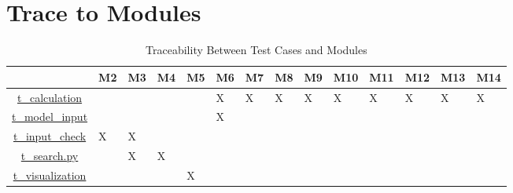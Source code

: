 \documentclass[12pt, titlepage]{article}
\begin{document}
\section{Trace to Modules}		
\begin{table}[h]
\centering

\begin{tabular}{|c|p{4mm}|p{4mm}|p{4mm}|p{4mm}|p{4mm}|p{4mm}|p{4mm}|p{4mm}|p{6mm}|p{6mm}|p{6mm}|p{6mm}|p{6mm}|}
\hline
	& M2 & M3 & M4  & M5 & M6 & M7 & M8 & M9 & M10 & M11 & M12 & M13 & M14 \\
\hline

\href{https://github.com/CynthiaLiu0805/BridgeCorrosion/blob/main/src/database/test_calculation.py}{t\_calculation}    & &  &  &  & X & X & X & X & X & X & X & X & X \\ \hline
\href{https://github.com/CynthiaLiu0805/BridgeCorrosion/blob/main/src/database/test_model_check.py}{t\_model\_input} & &  &  &  & X &  & &  &  &  &  &  & \\ \hline
\href{https://github.com/CynthiaLiu0805/BridgeCorrosion/blob/main/src/app/test_input_check.py}{t\_input\_check} & X & X &  &  &  &  & &  &  &  &  &  & \\ \hline
\href{https://github.com/CynthiaLiu0805/BridgeCorrosion/blob/main/src/app/test_search.py}{t\_search.py} & & X & X &  &  &  & &  &  &  &  &  & \\ \hline
\href{https://github.com/CynthiaLiu0805/BridgeCorrosion/blob/main/src/app/test_visualization.py}{t\_visualization} & &  &  & X &  &  & &  &  &  &  &  & \\ \hline

\end{tabular}
\caption{Traceability Between Test Cases and Modules}
\label{Table:test_modules}
\end{table}




\newpage{}
\end{document}
